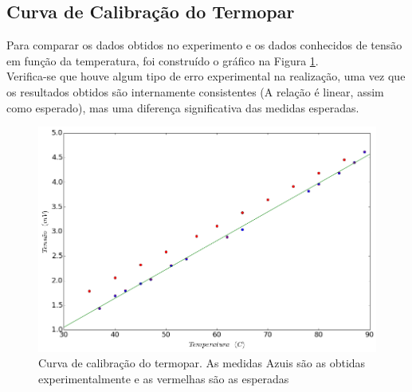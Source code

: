 \documentclass[12pt,a4paper]{article}
\begin{document}
\subsection{Curva de Calibração do Termopar}
Para comparar os dados obtidos no experimento e os dados conhecidos de tensão em função da temperatura, foi construído o gráfico na Figura \ref{termopar}.  \\
Verifica-se que houve algum tipo de erro experimental na realização, uma vez que os resultados obtidos são internamente consistentes (A relação é linear, assim como esperado), mas uma diferença significativa das medidas esperadas.


 
\begin{figure}[!htbp]
\includegraphics[scale=0.55]{termopar.png}
\caption{Curva de calibração do termopar. As medidas Azuis são as obtidas experimentalmente e as vermelhas são as esperadas}
\label{termopar}
\end{figure}
\end{document}
